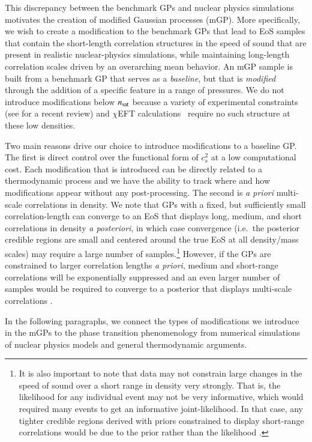 \documentclass[aps,prd,nofootinbib,tightenlines,notitlepage,floatfix,superscriptaddress,showkeys,twocolumn]{revtex4-1}
\newcommand{\nsat}{$n_{\rm sat}$ }
\begin{document}
This discrepancy between the benchmark GPs and nuclear physics simulations motivates the creation of modified Gaussian processes (mGP). More specifically, we wish to create a modification to the benchmark GPs that lead to EoS samples that contain the short-length correlation structures in the speed of sound that are present in realistic nuclear-physics simulations, while maintaining long-length correlation scales driven by an overarching mean behavior. 
An mGP sample is built from a benchmark GP that serves as a \emph{baseline}, but that is \emph{modified} through the addition of a specific feature in a range of pressures. We do not introduce modifications below \nsat because a variety of experimental constraints (see \cite{Li:2019xxz,MUSES:2023hyz} for a recent review) and $\chi$EFT calculations~\cite{Drischler:2021kxf} require no such structure at these low densities.

Two main reasons drive our choice to introduce modifications to a baseline GP. The first is  direct control over the functional form of $c_s^2$ at a low computational cost. Each modification that is introduced can be directly related to a thermodynamic process and we have the ability to track where and how modifications appear without any post-processing. The second is \emph{a priori} multi-scale correlations in density. We note that GPs with a fixed, but sufficiently small correlation-length can converge to an EoS that displays long, medium, and short correlations in density \emph{a posteriori}, in which case convergence (i.e.~the posterior credible regions are small and centered around the true EoS at all density/mass scales) may require a large number of samples.\footnote{It is also important to note that data may not constrain large changes in the speed of sound over a short range in density very strongly. That is, the likelihood for any individual event may not be very informative, which would required many events to get an informative joint-likelihood. In that case, any tighter credible regions derived with priors constrained to display short-range correlations would be due to the prior rather than the likelihood \cite{reedprivate}.} However, if the GPs are constrained to larger correlation lengths \emph{a priori}, medium and short-range correlations will be exponentially suppressed and an even larger number of samples would be required to converge to a posterior that displays multi-scale correlations \cite{reedprivate}.

In the following paragraphs, we connect the types of modifications we introduce in the mGPs to the phase transition phenomenology from numerical simulations of nuclear physics models and general thermodynamic arguments.
\end{document}
